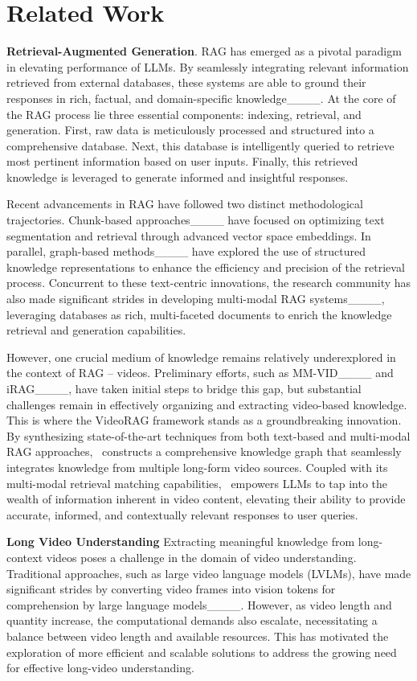 \section{Related Work}
\textbf{Retrieval-Augmented Generation}. 
RAG has emerged as a pivotal paradigm in elevating performance of LLMs. By seamlessly integrating relevant information retrieved from external databases, these systems are able to ground their responses in rich, factual, and domain-specific knowledge____. At the core of the RAG process lie three essential components: indexing, retrieval, and generation. First, raw data is meticulously processed and structured into a comprehensive database. Next, this database is intelligently queried to retrieve most pertinent information based on user inputs. Finally, this retrieved knowledge is leveraged to generate informed and insightful responses.

Recent advancements in RAG have followed two distinct methodological trajectories. Chunk-based approaches____ have focused on optimizing text segmentation and retrieval through advanced vector space embeddings. In parallel, graph-based methods____ have explored the use of structured knowledge representations to enhance the efficiency and precision of the retrieval process. Concurrent to these text-centric innovations, the research community has also made significant strides in developing multi-modal RAG systems____, leveraging databases as rich, multi-faceted documents to enrich the knowledge retrieval and generation capabilities.

However, one crucial medium of knowledge remains relatively underexplored in the context of RAG – videos. Preliminary efforts, such as MM-VID____ and iRAG____, have taken initial steps to bridge this gap, but substantial challenges remain in effectively organizing and extracting video-based knowledge. This is where the VideoRAG framework stands as a groundbreaking innovation. By synthesizing state-of-the-art techniques from both text-based and multi-modal RAG approaches, \model\ constructs a comprehensive knowledge graph that seamlessly integrates knowledge from multiple long-form video sources. Coupled with its multi-modal retrieval matching capabilities, \model\ empowers LLMs to tap into the wealth of information inherent in video content, elevating their ability to provide accurate, informed, and contextually relevant responses to user queries.

\textbf{Long Video Understanding}
Extracting meaningful knowledge from long-context videos poses a challenge in the domain of video understanding. Traditional approaches, such as large video language models (LVLMs), have made significant strides by converting video frames into vision tokens for comprehension by large language models____. However, as video length and quantity increase, the computational demands also escalate, necessitating a balance between video length and available resources. This has motivated the exploration of more efficient and scalable solutions to address the growing need for effective long-video understanding.

